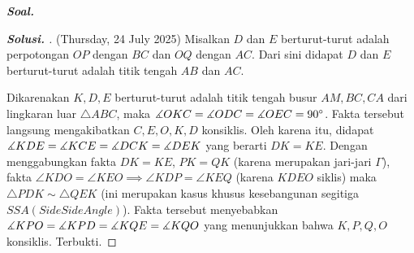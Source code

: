 \textbf{\textit{Soal.}} 

\begin{proof}[\textbf{Solusi. }] (Thursday, 24 July 2025) 
    Misalkan $D$ dan $E$ berturut-turut adalah perpotongan $OP$ dengan $BC$ dan $OQ$ dengan $AC$. Dari sini didapat $D$ dan $E$ berturut-turut adalah titik tengah $AB$ dan $AC$.
    
    Dikarenakan $K,D,E$ berturut-turut adalah titik tengah busur $AM, BC, CA$ dari lingkaran luar $\triangle ABC$, maka $\measuredangle OKC = \measuredangle ODC = \measuredangle OEC = 90^\circ$. Fakta tersebut langsung mengakibatkan $C,E,O,K,D$ konsiklis.
    Oleh karena itu, didapat $\measuredangle KDE = \measuredangle KCE = \measuredangle DCK = \measuredangle DEK$ yang berarti $DK=KE$.
    Dengan menggabungkan fakta $DK = KE$, $PK=QK$ (karena merupakan jari-jari $\Gamma$), fakta $\angle KDO = \angle KEO \implies \angle KDP = \angle KEQ$ (karena $KDEO$ siklis) maka $\triangle PDK \sim \triangle QEK$ (ini merupakan kasus khusus kesebangunan segitiga $SSA (Side Side Angle)$).
    Fakta tersebut menyebabkan $\measuredangle KPO = \measuredangle KPD = \measuredangle KQE = \measuredangle KQO$ yang menunjukkan bahwa $K,P,Q,O$ konsiklis. Terbukti.
\end{proof}